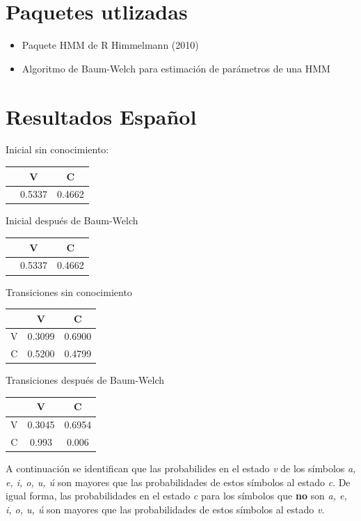\documentclass[]{article}
\begin{document}
\section{Paquetes utlizadas}\label{paquetes-utlizadas}

\begin{itemize}
\item
  Paquete HMM de R Himmelmann (2010)
\item
  Algoritmo de Baum-Welch para estimación de parámetros de una HMM
\end{itemize}

\section{Resultados Español}\label{resultados-espanol}

Inicial sin conocimiento:

\begin{longtable}[c]{@{}ccc@{}}
\toprule
& V & C\tabularnewline
\midrule
\endhead
& 0.5337 & 0.4662\tabularnewline
\bottomrule
\end{longtable}

Inicial después de Baum-Welch

\begin{longtable}[c]{@{}ccc@{}}
\toprule
& V & C\tabularnewline
\midrule
\endhead
& 0.5337 & 0.4662\tabularnewline
\bottomrule
\end{longtable}

Transiciones sin conocimiento

\begin{longtable}[c]{@{}ccc@{}}
\toprule
& V & C\tabularnewline
\midrule
\endhead
V & 0.3099 & 0.6900\tabularnewline
C & 0.5200 & 0.4799\tabularnewline
\bottomrule
\end{longtable}

Transiciones después de Baum-Welch

\begin{longtable}[c]{@{}ccc@{}}
\toprule
& V & C\tabularnewline
\midrule
\endhead
V & 0.3045 & 0.6954\tabularnewline
C & 0.993 & 0.006\tabularnewline
\bottomrule
\end{longtable}

A continuación se identifican que las probabilides en el estado \emph{v}
de los símbolos \emph{a, e, i, o, u, ú} son mayores que las
probabilidades de estos símbolos al estado \emph{c}. De igual forma, las
probabilidades en el estado \emph{c} para los símbolos que \textbf{no}
son \emph{a, e, i, o, u, ú} son mayores que las probabilidades de estos
símbolos al estado \emph{v}.
\end{document}
